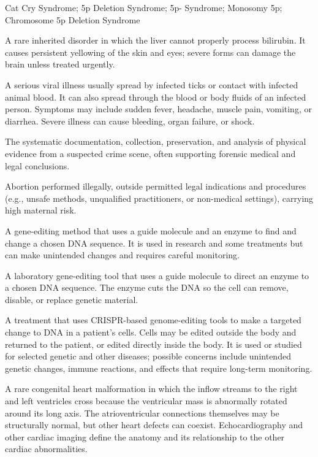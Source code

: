 \synonyms
Cat Cry Syndrome; 5p Deletion Syndrome; 5p- Syndrome; Monosomy 5p; Chromosome 5p Deletion Syndrome

 A rare inherited disorder in which the liver cannot properly process bilirubin. It causes persistent yellowing of the skin and eyes; severe forms can damage the brain unless treated urgently.

 A serious viral illness usually spread by infected ticks or contact with infected animal blood. It can also spread through the blood or body fluids of an infected person. Symptoms may include sudden fever, headache, muscle pain, vomiting, or diarrhea. Severe illness can cause bleeding, organ failure, or shock.


 The systematic documentation, collection, preservation, and analysis of physical evidence from a suspected crime scene, often supporting forensic medical and legal conclusions.

 Abortion performed illegally, outside permitted legal indications and procedures (e.g.,
unsafe methods, unqualified practitioners, or non-medical settings), carrying high
maternal risk.

 A gene-editing method that uses a guide molecule and an enzyme to find and change a chosen DNA sequence. It is used in research and some treatments but can make unintended changes and requires careful monitoring.

 A laboratory gene-editing tool that uses a guide molecule to direct an enzyme to a chosen DNA sequence. The enzyme cuts the DNA so the cell can remove, disable, or replace genetic material.

 A treatment that uses CRISPR-based genome-editing tools to make a targeted change to DNA in a patient’s cells. Cells may be edited outside the body and returned to the patient, or edited directly inside the body. It is used or studied for selected genetic and other diseases; possible concerns include unintended genetic changes, immune reactions, and effects that require long-term monitoring.

 A rare congenital heart malformation in which the inflow streams to the
right and left ventricles cross because the ventricular mass is abnormally rotated around its long
axis. The atrioventricular connections themselves may be structurally normal, but other heart
defects can coexist. Echocardiography and other cardiac imaging define the anatomy and its
relationship to the other cardiac abnormalities.


